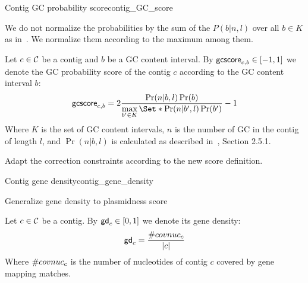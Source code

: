\begin{definition}{Contig GC probability score}{contig_GC_score}
  \begin{newfeatbox}
    We do not normalize the probabilities by the sum of the \(P(b|n,l)\) over all \(b \in K\) as in~\cite{manePlasBinflowFlowbasedMILP2023}. We normalize them according to the maximum among them.
  \end{newfeatbox}
  Let \(c \in \mathcal{C}{}\) be a contig and \(b\) be a GC content interval.
  By \(\mathsf{gcscore}_{c, b} \in [-1, 1]\) we denote the GC probability score of the contig \(c\) according to the GC content interval \(b\):
  \[
    \gcscore{c}{b} = 2 \frac{\Pr(n|b,l)\Pr(b)}{\max\limits_{b' \in K}\Set*{\Pr(n|b',l)\Pr(b')}} - 1
  \]
  Where \(K\) is the set of GC content intervals, \(n\) is the number of GC in the contig of length \(l\), and \(\Pr(n|b,l)\) is calculated as described in~\cite{manePlasBinflowFlowbasedMILP2023}, Section 2.5.1.

  \begin{fixmebox}
    Adapt the correction constraints according to the new score definition.
  \end{fixmebox}
\end{definition}

\begin{definition}{Contig gene density}{contig_gene_density}
  \begin{refactorbox}
    Generalize gene density to plasmidness score
  \end{refactorbox}
  Let \(c \in \mathcal{C}{}\) be a contig.
  By \(\mathsf{gd}_{c} \in [0, 1]\) we denote its gene density:
  \[
    \mathsf{gd}_{c} = \frac{ \#covnuc_{c} }{ |c| }
  \]
  Where \(\#covnuc_{c}\) is the number of nucleotides of contig \(c\) covered by gene mapping matches.
\end{definition}